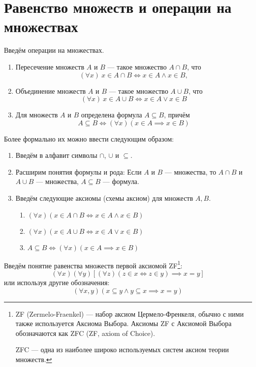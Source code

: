 \section{Равенство множеств и операции на множествах}

Введём операции на множествах.
\begin{enumerate}
	\item{}Пересечение множеств $A$ и $B$ --- такое множество $A\cap B$, что
	\[
		(\forall x)~x\in A\cap B\iff x\in A\land x\in B,
	\]

	\item{}Объединение множеств $A$ и $B$ --- такое множество $A\cup B$, что
	\[
		(\forall x)~x\in A\cup B\iff x\in A\lor x\in B
	\]

	\item{}Для множеств $A$ и $B$ определена формула $A\subseteq B$, причём
	\[
		A\subseteq B\iff (\forall x)(x\in A\implies x\in B)
	\]
\end{enumerate}

Более формально их можно ввести следующим образом:
\begin{enumerate}
	\item{}Введём в алфавит символы $\cap$, $\cup$ и $\subseteq$.
	\item{}Расширим понятия формулы и рода: Если $A$ и $B$ --- множества,
	то  $A\cap B$ и $A\cup B$ --- множества, $A\subseteq B$ --- формула.
	\item{}Введём следующие аксиомы (схемы аксиом) для множеств $A,B$.
	\begin{enumerate}
		\item{}$(\forall x)(x\in A\cap B\iff x\in A\land x\in B)$
		\item{}$(\forall x)(x\in A\cup B\iff x\in A\lor x\in B)$
		\item{}$A\subseteq B \iff (\forall x)(x\in A\implies x\in B)$
	\end{enumerate}
\end{enumerate}

Введём понятие равенства множеств первой аксиомой ZF\footnote{
	ZF (Zermelo-Fraenkel) --- набор аксиом Цермело-Френкеля, обычно с ними также
	используется Аксиома Выбора. Аксиомы ZF с Аксиомой Выбора
	обозначаются как ZFC (ZF, axiom of Choice).

	ZFC --- одна из наиболее широко используемых систем аксиом теории множеств.
}:
\[
	(\forall x)(\forall y)[(\forall z)(z\in x\iff z\in y)\implies x=y]
\]
или используя другие обозначения:
\[
	(\forall x,y)(x\subseteq y\land y\subseteq x\implies x=y)
\]

